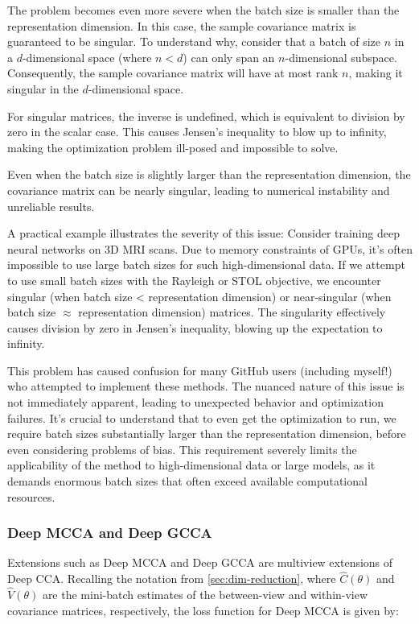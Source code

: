 The problem becomes even more severe when the batch size is smaller than the representation dimension. In this case, the sample covariance matrix is guaranteed to be singular. To understand why, consider that a batch of size $n$ in a $d$-dimensional space (where $n < d$) can only span an $n$-dimensional subspace. Consequently, the sample covariance matrix will have at most rank $n$, making it singular in the $d$-dimensional space.

For singular matrices, the inverse is undefined, which is equivalent to division by zero in the scalar case. This causes Jensen's inequality to blow up to infinity, making the optimization problem ill-posed and impossible to solve.

Even when the batch size is slightly larger than the representation dimension, the covariance matrix can be nearly singular, leading to numerical instability and unreliable results.

A practical example illustrates the severity of this issue: Consider training deep neural networks on 3D MRI scans. Due to memory constraints of GPUs, it's often impossible to use large batch sizes for such high-dimensional data. If we attempt to use small batch sizes with the Rayleigh or STOL objective, we encounter singular (when batch size < representation dimension) or near-singular (when batch size $\approx$ representation dimension) matrices. The singularity effectively causes division by zero in Jensen's inequality, blowing up the expectation to infinity.

This problem has caused confusion for many GitHub users (including myself!) who attempted to implement these methods. The nuanced nature of this issue is not immediately apparent, leading to unexpected behavior and optimization failures. It's crucial to understand that to even get the optimization to run, we require batch sizes substantially larger than the representation dimension, before even considering problems of bias. This requirement severely limits the applicability of the method to high-dimensional data or large models, as it demands enormous batch sizes that often exceed available computational resources.

\subsubsection{Deep MCCA and Deep GCCA}
Extensions such as Deep MCCA \citep{somandepalli2019multimodal} and Deep GCCA \citep{benton2017deep} are multiview extensions of Deep CCA. 
Recalling the notation from \ref{sec:dim-reduction}, where $\hat{C}(\theta)$ and $\hat{V}(\theta)$ are the mini-batch estimates of the between-view and within-view covariance matrices, respectively, the loss function for Deep MCCA is given by:

